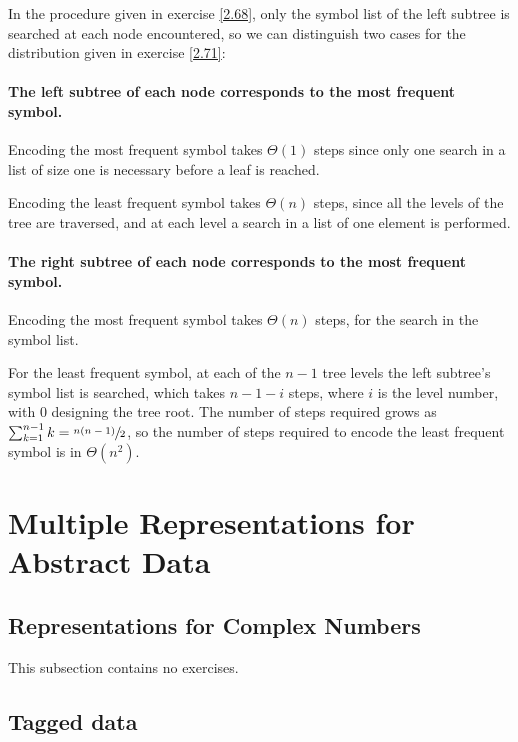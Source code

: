 \begin{exe}[2.72]
    In the  procedure given in exercise \ref{2.68}, only the 
    symbol list of the left subtree is searched at each node encountered, so we 
    can distinguish two cases for the distribution given in exercise \ref{2.71}:

    \paragraph*{The left subtree of each node corresponds to the most frequent 
    symbol.}
    Encoding the most frequent symbol takes $\Theta(1)$ steps since only 
    one search in a list of size one is necessary before a leaf is reached.

    Encoding the least frequent symbol takes $\Theta(n)$ steps, since 
    all the levels of the tree are traversed, and at each level a search in 
    a list of one element is performed.

    \paragraph*{The right subtree of each node corresponds to the most frequent 
    symbol.}
    Encoding the most frequent symbol takes $\Theta(n)$ steps, for the search in 
    the symbol list.

    For the least frequent symbol, at each of the $n - 1$ tree levels the left 
    subtree’s symbol list is searched, which takes $n - 1 - i$ steps, where $i$ 
    is the level number, with $0$ designing the tree root. The number of steps 
    required grows as $\sum_{k = 1}^{n - 1} k = \sfrac{n (n - 1)}{2}$, so the 
    number of steps required to encode the least frequent symbol is in 
    $\Theta(n^2)$.
\end{exe}

\section{Multiple Representations for Abstract Data}

\subsection{Representations for Complex Numbers}

This subsection contains no exercises.

\subsection{Tagged data}

